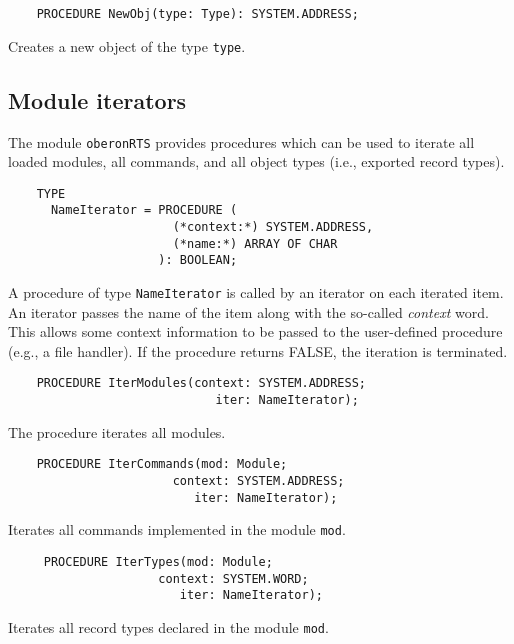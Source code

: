
\verb'    PROCEDURE NewObj(type: Type): SYSTEM.ADDRESS;'

Creates a new object of the type {\tt type}.

\subsection{Module iterators}

The module \verb'oberonRTS'
provides procedures which can be used to iterate all loaded
modules, all commands, and all object types (i.e., exported record
types).

\begin{verbatim}
    TYPE
      NameIterator = PROCEDURE (
                       (*context:*) SYSTEM.ADDRESS,
                       (*name:*) ARRAY OF CHAR
                     ): BOOLEAN;
\end{verbatim}
A procedure of type {\tt NameIterator} is called by
an iterator on each iterated item. An iterator passes
the name of the item along with the so-called {\em context} word.
This allows some context information to be passed to the
user-defined procedure (e.g., a file handler).
If the procedure returns FALSE, the iteration is terminated.

\begin{verbatim}
    PROCEDURE IterModules(context: SYSTEM.ADDRESS;
                             iter: NameIterator);
\end{verbatim}
The procedure iterates all \ot{} modules.

\begin{verbatim}
    PROCEDURE IterCommands(mod: Module;
                       context: SYSTEM.ADDRESS;
                          iter: NameIterator);
\end{verbatim}
Iterates all commands implemented in the module {\tt mod}.

\begin{verbatim}
     PROCEDURE IterTypes(mod: Module;
                     context: SYSTEM.WORD;
                        iter: NameIterator);
\end{verbatim}
Iterates all record types declared in the module {\tt mod}.


